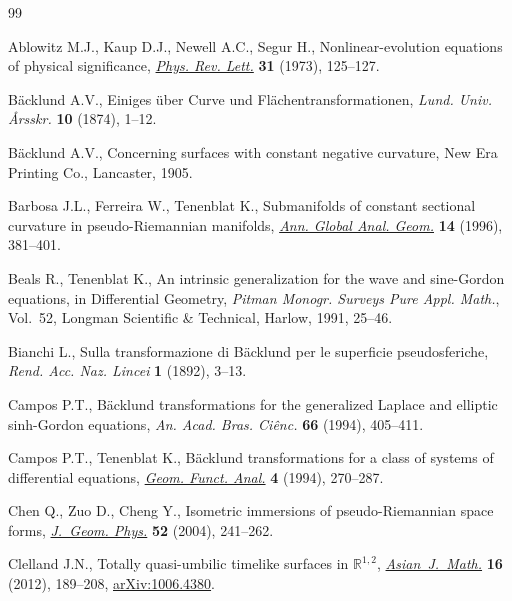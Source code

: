 \documentclass[pdftex]{sigma}
\numberwithin{equation}{section}
\begin{document}
\begin{thebibliography}{99}
\footnotesize\itemsep=0pt

Ablowitz M.J., Kaup D.J., Newell A.C., Segur H., Nonlinear-evolution equations
 of physical significance, \href{https://doi.org/10.1103/PhysRevLett.31.125}{\textit{Phys. Rev. Lett.}} \textbf{31} (1973),
 125--127.

B\"acklund A.V., Einiges \"uber {C}urve und {F}l\"achentransformationen,
 \textit{Lund. Univ. {\AA}rsskr.} \textbf{10} (1874), 1--12.

B\"acklund A.V., Concerning surfaces with constant negative curvature, {N}ew
 {E}ra {P}rinting {C}o., {L}ancaster, 1905.

Barbosa J.L., Ferreira W., Tenenblat K., Submanifolds of constant sectional
 curvature in pseudo-{R}iemannian manifolds, \href{https://doi.org/10.1007/BF00129898}{\textit{Ann. Global Anal. Geom.}}
 \textbf{14} (1996), 381--401.

Beals R., Tenenblat K., An intrinsic generalization for the wave and
 sine-{G}ordon equations, in Differential {G}eometry, \textit{Pitman Monogr.
 Surveys Pure Appl. Math.}, Vol.~52, Longman Scientific \& Technical, Harlow,
 1991, 25--46.

Bianchi L., Sulla transformazione di B\"acklund per le superficie
 pseudosferiche, \textit{Rend. Acc. Naz. Lincei} \textbf{1} (1892), 3--13.

Campos P.T., B\"acklund transformations for the generalized {L}aplace and
 elliptic sinh-{G}ordon equations, \textit{An. Acad. Bras. Ci\^enc.}
 \textbf{66} (1994), 405--411.

Campos P.T., Tenenblat K., B\"acklund transformations for a class of systems of
 differential equations, \href{https://doi.org/10.1007/BF01896242}{\textit{Geom. Funct. Anal.}} \textbf{4} (1994),
 270--287.

Chen Q., Zuo D., Cheng Y., Isometric immersions of pseudo-{R}iemannian space
 forms, \href{https://doi.org/10.1016/j.geomphys.2004.03.002}{\textit{J.~Geom. Phys.}} \textbf{52} (2004), 241--262.

Clelland J.N., Totally quasi-umbilic timelike surfaces in {${\mathbb
 R}^{1,2}$}, \href{https://doi.org/10.4310/AJM.2012.v16.n2.a2}{\textit{Asian~J.~Math.}} \textbf{16} (2012), 189--208,
 \href{https://arxiv.org/abs/1006.4380}{arXiv:1006.4380}.


\end{thebibliography}
\end{document}
